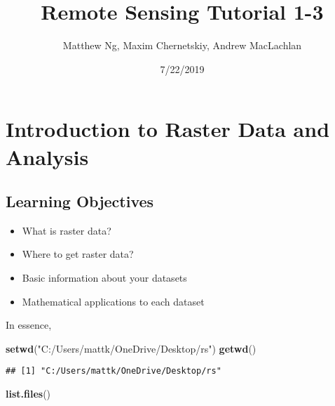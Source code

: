 \documentclass[]{article}
\title{Remote Sensing Tutorial 1-3}
\author{Matthew Ng, Maxim Chernetskiy, Andrew MacLachlan}
\date{7/22/2019}
\newenvironment{Shaded}{\begin{snugshade}}{\end{snugshade}}
\newcommand{\KeywordTok}[1]{\textcolor[rgb]{0.13,0.29,0.53}{\textbf{#1}}}
\newcommand{\NormalTok}[1]{#1}
\newcommand{\StringTok}[1]{\textcolor[rgb]{0.31,0.60,0.02}{#1}}
\providecommand{\tightlist}{%
  \setlength{\itemsep}{0pt}\setlength{\parskip}{0pt}}
\begin{document}
\maketitle

\hypertarget{introduction-to-raster-data-and-analysis}{%
\section{Introduction to Raster Data and
Analysis}\label{introduction-to-raster-data-and-analysis}}

\hypertarget{learning-objectives}{%
\subsection{Learning Objectives}\label{learning-objectives}}

\begin{itemize}
\tightlist
\item
  What is raster data?
\item
  Where to get raster data?
\item
  Basic information about your datasets
\item
  Mathematical applications to each dataset
\end{itemize}

In essence,

\begin{Shaded}
\begin{Highlighting}[]
\KeywordTok{setwd}\NormalTok{(}\StringTok{"C:/Users/mattk/OneDrive/Desktop/rs"}\NormalTok{)}
\KeywordTok{getwd}\NormalTok{()}
\end{Highlighting}
\end{Shaded}

\begin{verbatim}
## [1] "C:/Users/mattk/OneDrive/Desktop/rs"
\end{verbatim}

\begin{Shaded}
\begin{Highlighting}[]
\KeywordTok{list.files}\NormalTok{()}
\end{Highlighting}
\end{Shaded}
\end{document}
